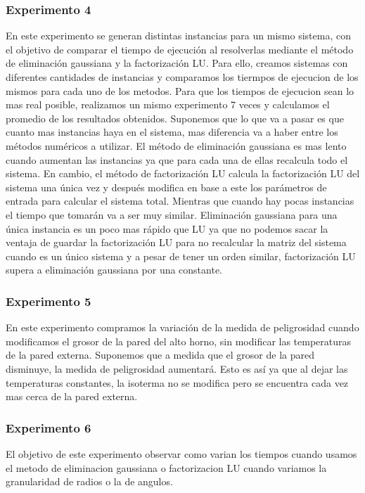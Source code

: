   	\subsubsection*{Experimento 4}
  	En este experimento se generan distintas instancias para un mismo sistema, con el objetivo de comparar el tiempo de ejecución al resolverlas mediante el método de eliminación gaussiana y la factorización LU. 
  	Para ello, creamos sistemas con diferentes cantidades de instancias y comparamos los tiermpos de ejecucion de los mismos para cada uno de los metodos.
  	Para que los tiempos de ejecucion sean lo mas real posible, realizamos un mismo experimento 7 veces y calculamos el promedio de los resultados obtenidos.
  	Suponemos que lo que va a pasar es que cuanto mas instancias haya en el sistema, mas diferencia va a haber entre los métodos numéricos a utilizar. El método de eliminación gaussiana es mas lento cuando aumentan las instancias ya que para cada una de ellas recalcula todo el sistema. En cambio, el método de factorización LU calcula la factorización LU del sistema una única vez y después modifica en base a este los parámetros de entrada para calcular el sistema total. Mientras que cuando hay pocas instancias el tiempo que tomarán va a ser muy similar. Eliminación gaussiana para una única instancia es un poco mas rápido que LU ya que no podemos sacar la ventaja de guardar la factorización LU para no recalcular la matriz del sistema cuando es un único sistema y a pesar de tener un orden similar, factorización LU supera a eliminación gaussiana por una constante.

  	\subsubsection*{Experimento 5}
  	En este experimento compramos la variación de la medida de peligrosidad cuando modificamos el grosor de la pared del alto horno, sin modificar las temperaturas de la pared externa.
	Suponemos que a medida que el grosor de la pared disminuye, la medida de peligrosidad aumentará. Esto es así ya que al dejar las temperaturas constantes, la isoterma no se modifica pero se encuentra cada vez mas cerca de la pared externa.

  	\subsubsection*{Experimento 6}
  	El objetivo de este experimento observar como varian los tiempos cuando usamos el metodo de eliminacion gaussiana o factorizacion LU cuando variamos la granularidad de radios o la de angulos.
  	
